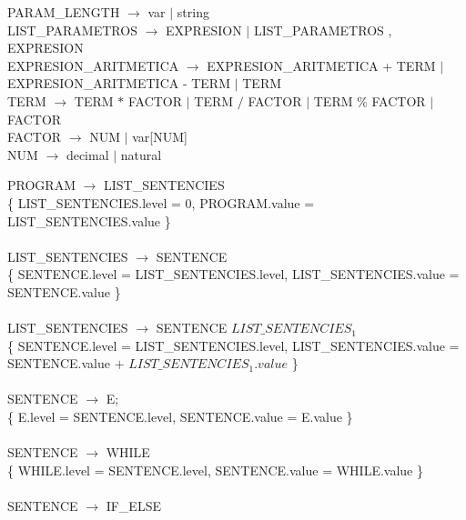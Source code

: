 \documentclass[10pt,a4paper]{article}
\begin{document}
PARAM\_LENGTH $\rightarrow$ var $|$ string \\

LIST\_PARAMETROS $\rightarrow$ EXPRESION $|$ LIST\_PARAMETROS , EXPRESION \\

EXPRESION\_ARITMETICA $\rightarrow$ EXPRESION\_ARITMETICA + TERM $|$ EXPRESION\_ARITMETICA - TERM $|$ TERM \\

TERM $\rightarrow$ TERM $*$ FACTOR $|$ TERM $/$ FACTOR $|$ TERM \% FACTOR $|$ FACTOR \\

FACTOR $\rightarrow$ NUM $|$ var[NUM] \\

NUM $\rightarrow$ decimal $|$ natural


\newpage

PROGRAM $\rightarrow$ LIST\_SENTENCIES \\

\{ LIST\_SENTENCIES.level = 0, PROGRAM.value = LIST\_SENTENCIES.value \} \\ \\


LIST\_SENTENCIES $\rightarrow$ SENTENCE \\

\{ SENTENCE.level = LIST\_SENTENCIES.level, LIST\_SENTENCIES.value = SENTENCE.value \}  \\ \\


LIST\_SENTENCIES $\rightarrow$ SENTENCE  $LIST\_SENTENCIES_{1}$ \\

\{ SENTENCE.level = LIST\_SENTENCIES.level, LIST\_SENTENCIES.value = SENTENCE.value + $LIST\_SENTENCIES_{1}.value$  \} \\  \\


SENTENCE $\rightarrow$  E; \\ 

\{ E.level = SENTENCE.level, SENTENCE.value = E.value \}  \\ \\

SENTENCE $\rightarrow$  WHILE  \\ 

\{ WHILE.level = SENTENCE.level, SENTENCE.value = WHILE.value \}  \\ \\

SENTENCE $\rightarrow$  IF\_ELSE  \\ 
\end{document}
